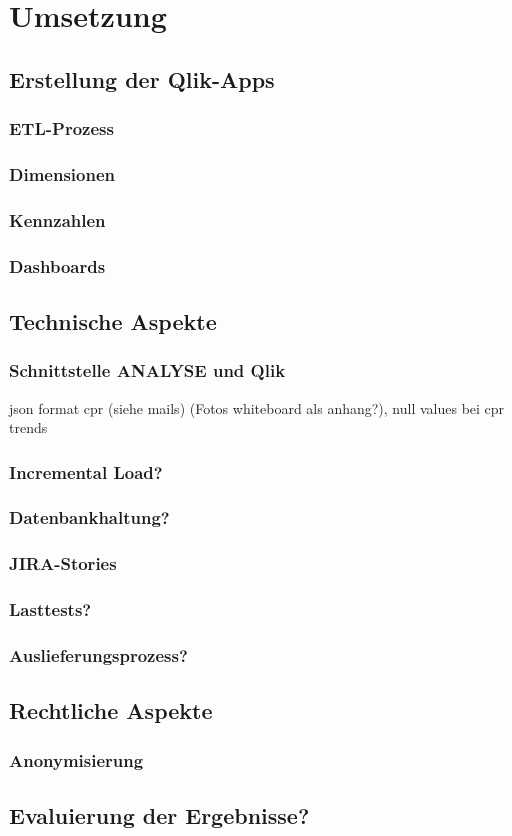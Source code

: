 \chapter{Umsetzung}
\label{umsetzung}
\minitoc\pagebreak

\section{Erstellung der Qlik-Apps}
\subsection{ETL-Prozess}
\subsection{Dimensionen}
\subsection{Kennzahlen}
\subsection{Dashboards}

\section{Technische Aspekte}
\subsection{Schnittstelle ANALYSE und Qlik}
json format cpr (siehe mails) (Fotos whiteboard als anhang?),
null values bei cpr trends
\subsection{Incremental Load?}
\subsection{Datenbankhaltung?}
\subsection{JIRA-Stories}
\subsection{Lasttests?}
\subsection{Auslieferungsprozess?}

\section{Rechtliche Aspekte}
\subsection{Anonymisierung}

\section{Evaluierung der Ergebnisse?}
